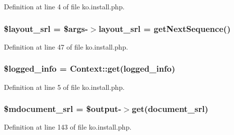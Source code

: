Definition at line 4 of file ko.\+install.\+php.

\hypertarget{ko_8install_8php_a77889723c4aa360089caae223118d413}{}
\subsubsection[{\$layout\+\_\+srl}]{\setlength{\rightskip}{0pt plus 5cm}\${\bf layout\+\_\+srl} = \$args-\/$>${\bf layout\+\_\+srl} = {\bf get\+Next\+Sequence}()}\label{ko_8install_8php_a77889723c4aa360089caae223118d413}


Definition at line 47 of file ko.\+install.\+php.

\hypertarget{ko_8install_8php_a193c1593ceb216e9fb05b0bad01ebbc8}{}
\subsubsection[{\$logged\+\_\+info}]{\setlength{\rightskip}{0pt plus 5cm}\$logged\+\_\+info = {\bf Context\+::get}(\textquotesingle{}logged\+\_\+info\textquotesingle{})}\label{ko_8install_8php_a193c1593ceb216e9fb05b0bad01ebbc8}


Definition at line 5 of file ko.\+install.\+php.

\hypertarget{ko_8install_8php_a27c211d9a984964f84c8ffb6ea7328fc}{}
\subsubsection[{\$mdocument\+\_\+srl}]{\setlength{\rightskip}{0pt plus 5cm}\$mdocument\+\_\+srl = \$output-\/$>$get(\textquotesingle{}document\+\_\+srl\textquotesingle{})}\label{ko_8install_8php_a27c211d9a984964f84c8ffb6ea7328fc}


Definition at line 143 of file ko.\+install.\+php.

\hypertarget{ko_8install_8php_a874928b6d7b44487718f1ede4a9f6ffe}{}

